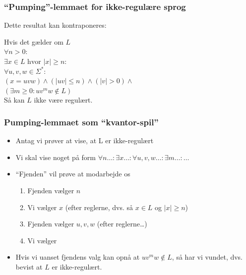 \begin{frame}
\frametitle{``Pumping''-lemmaet for \alert{ikke}-regulære sprog}
Dette resultat kan kontraponeres:
\pause
{}%
\begin{beamerboxesrounded}[lower=lowercol,shadow=true]{}
  Hvis det gælder om $L$\\
\pause
\hspace{1cm}$\forall n>0:$\\
\pause
\hspace{2cm}$\exists x\in L \text{ hvor } |x| \geq n:$\\
\pause
\hspace{3cm}$\forall u,v,w\in \Sigma^*:$\\
\pause
\hspace{4cm}$(x = uvw) \wedge (|uv|\leq n) \wedge (|v| > 0) \wedge$\\
\pause
\hspace{4cm}$(\exists m\geq 0: uv^mw\not\in L)$\\
\pause
Så kan $L$ ikke være regulært.
\end{beamerboxesrounded}
\end{frame}

\begin{frame}
\frametitle{Pumping-lemmaet som ``kvantor-spil''}
\begin{itemize}[<+->]
\item  Antag vi prøver at vise, at L er ikke-regulært 
\item  Vi skal vise noget på form 
 $\forall n\ldots:   \exists x\ldots:  \forall u,v,w \ldots:  \exists m\ldots:  \ldots$ 
\item  ``Fjenden'' vil prøve at modarbejde os
  \begin{enumerate}
  \item Fjenden vælger {\color{dr}$n$}
  \item Vi vælger {\color{dg}$x$}   (efter reglerne, dvs. så $x\in L$ og $|x|\geq n$) 
  \item Fjenden vælger {\color{dr}$u,v,w$}   (efter reglerne\ldots) 
  \item Vi vælger \color{dg}{$m$}
  \end{enumerate}
\item
Hvis vi uanset fjendens valg kan opnå at $uv^mw\not\in L$, 
så har vi vundet, dvs. bevist at $L$ er ikke-regulært.
\end{itemize}
\end{frame}

